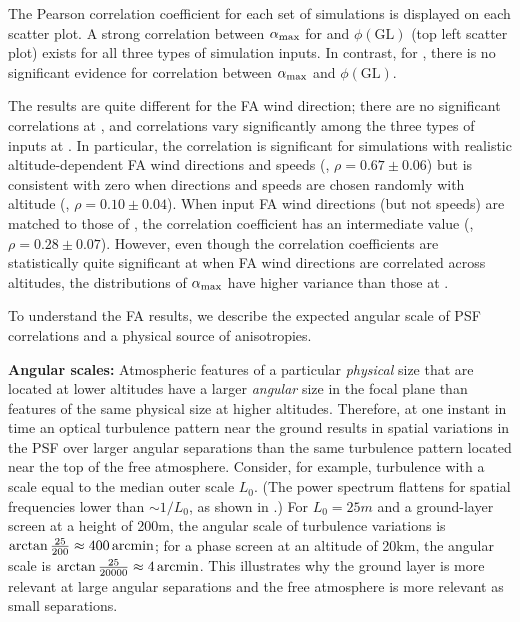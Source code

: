 \documentclass[twocolumn]{aastex631}
\begin{document}
The Pearson correlation coefficient for each set of simulations is displayed on each scatter plot. 
A strong correlation between $\alpha_{\rm max}$ for \largesep and $\phi(\text{GL})$ (top left scatter plot) exists for all three types of simulation inputs. 
In contrast, for \smallsep, there is no significant evidence for correlation between $\alpha_{\rm max}$ and $\phi(\text{GL})$.

The results are quite different for the FA wind direction; there are no significant correlations at \largesep, and correlations vary significantly among the three types of inputs at \smallsep.
In particular, the correlation is significant for simulations with realistic altitude-dependent FA wind directions and speeds (\psfwssims, $\rho=0.67\pm0.06$) but is consistent with zero when directions and speeds are chosen randomly with altitude (\bench, $\rho=0.10\pm0.04$). 
When input FA wind directions (but not speeds) are matched to those of \psfwssims, the correlation coefficient has an intermediate value (\match, $\rho=0.28\pm0.07$). 
However, even though the correlation coefficients are statistically quite significant at \smallsep when FA wind directions are correlated across altitudes, the distributions of $\alpha_{\rm max}$ have higher variance than those at \largesep.  

To understand the FA results, we describe the expected angular scale of PSF correlations and a physical source of anisotropies. 

{\bf Angular scales:}
Atmospheric features of a particular \textit{physical} size that are located at lower altitudes have a larger \textit{angular} size in the focal plane than features of the same physical size at higher altitudes. 
Therefore, at one instant in time an optical turbulence pattern near the ground results in spatial variations in the PSF over larger angular separations than the same turbulence pattern located near the top of the free atmosphere. 
Consider, for example,  turbulence with a scale equal to the median outer scale $L_0$. 
(The power spectrum flattens for spatial frequencies lower than $\sim 1/L_0$, as shown in .) 
For $L_0 = 25\unit{m}$ and a ground-layer screen at a height of  200\unit{m}, the angular scale of turbulence variations is $\arctan\frac{25}{200}\approx 400\mathrm{\,arcmin}$; 
for a phase screen at an altitude of 20\unit{km}, the angular scale is $\arctan\frac{25}{20000}\approx 4\mathrm{\,arcmin}$.
This illustrates why the ground layer is more relevant at large angular separations and the free atmosphere is more relevant as small separations.
\end{document}

